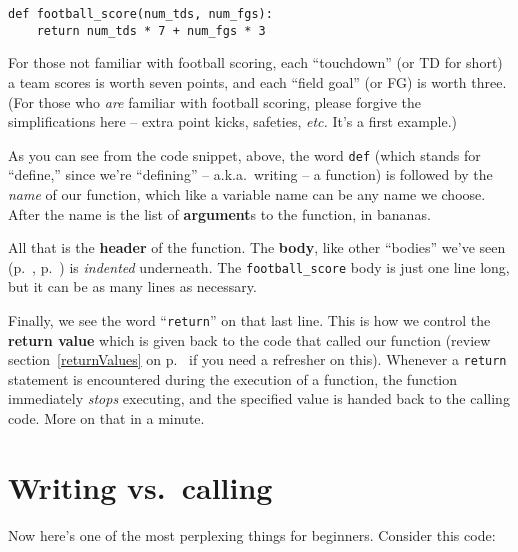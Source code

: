 \begin{Verbatim}[fontsize=\small,samepage=true,frame=single,framesep=3mm]
def football_score(num_tds, num_fgs):
    return num_tds * 7 + num_fgs * 3
\end{Verbatim}

For those not familiar with football scoring, each ``touchdown'' (or TD for
short) a team scores is worth seven points, and each ``field goal'' (or FG) is
worth three. (For those who \textit{are} familiar with football scoring, please
forgive the simplifications here -- extra point kicks, safeties, \textit{etc.}
It's a first example.)


As you can see from the code snippet, above, the word \texttt{def} (which
stands for ``define,'' since we're ``defining'' -- a.k.a.~writing -- a
function) is followed by the \textit{name} of our function, which like a
variable name can be any name we choose. After the name is the list of
\textbf{argument}s to the function, in bananas.


All that is the \textbf{header} of the function. The \textbf{body}, like other
``bodies'' we've seen (p.~\pageref{loopBody}, p.~\pageref{ifBody}) is
\textit{indented} underneath. The \texttt{football\_score} body is just one
line long, but it can be as many lines as necessary.

\label{returnImmediatelyReturns}

Finally, we see the word ``\texttt{return}'' on that last line. This is how we
control the \textbf{return value} which is given back to the code that called
our function (review section~\ref{returnValues} on p.~\pageref{returnValues} if
you need a refresher on this). Whenever a \texttt{return} statement is
encountered during the execution of a function, the function immediately
\textit{stops} executing, and the specified value is handed back to the calling
code. More on that in a minute.

\section{Writing vs.~calling}

Now here's one of the most perplexing things for beginners. Consider this code:


